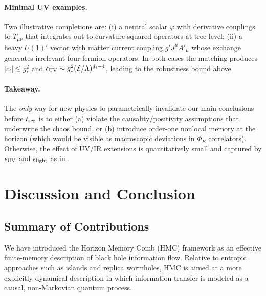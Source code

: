 \documentclass[a4paper,11pt]{article}
\newcommand{\Eflux}{\Phi_E}
\newcommand{\HMC}{\textup{\textsc{HMC}}\xspace}
\theoremstyle{plain}
\theoremstyle{definition}
\theoremstyle{remark}
\begin{document}
\paragraph{Minimal UV examples.} Two illustrative completions are: (i) a neutral scalar $\varphi$ with derivative couplings to $T_{\mu\nu}$ that integrates out to curvature-squared operators at tree-level; (ii) a heavy $U(1)'$ vector with matter current coupling $g' J^\mu A'_\mu$ whose exchange generates irrelevant four-fermion operators. In both cases the matching produces $|c_i|\lesssim g_\ast^2$ and $\epsilon_{\rm UV}\sim g_\ast^2(\mathcal{E}/\Lambda)^{d_i-4}$, leading to the robustness bound above.

\paragraph{Takeaway.} The \emph{only} way for new physics to parametrically invalidate our main conclusions before $t_{\rm scr}$ is to either (a) violate the causality/positivity assumptions that underwrite the chaos bound, or (b) introduce order-one nonlocal memory at the horizon (which would be visible as macroscopic deviations in $\Eflux$ correlators). Otherwise, the effect of UV/IR extensions is quantitatively small and captured by $\epsilon_{\rm UV}$ and $\epsilon_{\rm light}$ as in .


\section{Discussion and Conclusion}
\label{sec:conclusion}

\subsection{Summary of Contributions}
We have introduced the Horizon Memory Comb (\HMC{}) framework as an effective finite-memory description of black hole information flow. Relative to entropic approaches such as islands and replica wormholes, \HMC{} is aimed at a more explicitly dynamical description in which information transfer is modeled as a causal, non-Markovian quantum process.
\end{document}

